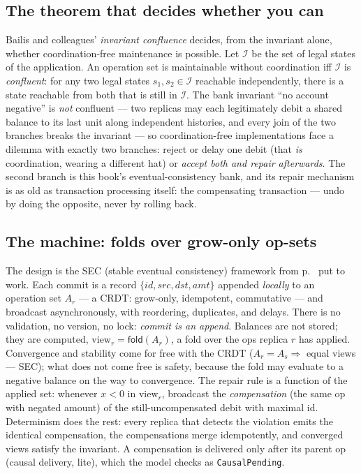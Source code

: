 \subsection*{The theorem that decides whether you can}

Bailis and colleagues' \emph{invariant confluence}
\cite{bailis14confluence} decides, from the invariant alone, whether
coordination-free maintenance is possible. Let $\mathcal{I}$ be the set of
legal states of the application. An operation set is maintainable without
coordination iff $\mathcal{I}$ is \emph{confluent}: for any two legal states
$s_1, s_2 \in \mathcal{I}$ reachable independently, there is a state
reachable from both that is still in $\mathcal{I}$. The bank invariant
``no account negative'' is \emph{not} confluent --- two replicas may each
legitimately debit a shared balance to its last unit along independent
histories, and every join of the two branches breaks the invariant --- so
coordination-free implementations face a dilemma with exactly two branches:
reject or delay one debit (that \emph{is} coordination, wearing a different
hat) or \emph{accept both and repair afterwards}. The second branch is this
book's eventual-consistency bank, and its repair mechanism is as old as
transaction processing itself: the compensating transaction
\cite{garciamolina87sagas} --- undo by doing the opposite, never by
rolling back.

\subsection*{The machine: folds over grow-only op-sets}

The design is the SEC (stable eventual consistency) framework \cite{burgader17sec} from
p.~\pageref{cha:notation} put to work. Each commit is a record
$\{\mathit{id}, \mathit{src}, \mathit{dst}, \mathit{amt}\}$ appended
\emph{locally} to an operation set $A_r$ --- a CRDT: grow-only,
idempotent, commutative --- and broadcast asynchronously, with reordering,
duplicates, and delays. There is no validation, no version, no lock:
\emph{commit is an append}. Balances are not stored; they are computed,
$\mathrm{view}_r = \mathsf{fold}(A_r)$, a fold over the ops replica $r$ has
applied. Convergence and stability come for free with the CRDT
($A_r = A_s \Rightarrow$ equal views --- \textsf{SEC}); what does not come
free is safety, because the fold may evaluate to a negative balance on the
way to convergence. The repair rule is a function of the applied set:
whenever $x < 0$ in $\mathrm{view}_r$, broadcast the \emph{compensation}
(the same op with negated amount) of the still-uncompensated debit with
maximal id. Determinism does the rest: every replica that detects the
violation emits the identical compensation, the compensations merge
idempotently, and converged views satisfy the invariant. A compensation is
delivered only after its parent op (causal delivery, lite), which the model
checks as \texttt{CausalPending}.

